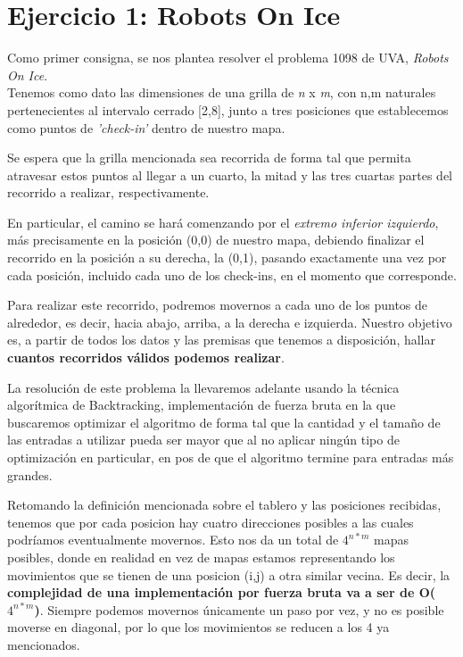 \section{Ejercicio 1: Robots On Ice}

Como primer consigna, se nos plantea resolver el problema 1098 de UVA, \textit{Robots On Ice}. \\

Tenemos como dato las dimensiones de una grilla de \textit{n} x \textit{m}, con n,m naturales pertenecientes al intervalo cerrado [2,8], junto a tres posiciones que establecemos como puntos de \textit{'check-in'} dentro de nuestro mapa. 

Se espera que la grilla mencionada sea recorrida de forma tal que permita atravesar estos puntos al llegar a un cuarto, la mitad y las tres cuartas partes del recorrido a realizar, respectivamente. 

En particular, el camino se hará comenzando por el \textit{extremo inferior izquierdo}, más precisamente en la posición (0,0) de nuestro mapa, debiendo finalizar el recorrido en la posición a su derecha, la (0,1), pasando exactamente una vez por cada posición, incluido cada uno de los check-ins, en el momento que corresponde. 

Para realizar este recorrido, podremos movernos a cada uno de los puntos de alrededor, es decir, hacia abajo, arriba, a la derecha e izquierda.
Nuestro objetivo es, a partir de todos los datos y las premisas que tenemos a disposición, hallar \textbf{cuantos recorridos válidos podemos realizar}.  \newline

La resolución de este problema la llevaremos adelante usando la técnica algorítmica de Backtracking, implementación de fuerza bruta en la que buscaremos optimizar el algoritmo de forma tal que la cantidad y el tamaño de las entradas a utilizar pueda ser mayor que al no aplicar ningún tipo de optimización en particular, en pos de que el algoritmo termine para entradas más grandes. \newline

Retomando la definición mencionada sobre el tablero y las posiciones recibidas, tenemos que por cada posicion hay cuatro direcciones posibles a las cuales podríamos eventualmente movernos. Esto nos da un total de $4^{n*m}$ mapas posibles, donde en realidad en vez de mapas estamos representando los movimientos que se tienen de una posicion (i,j) a otra similar vecina. Es decir, la \textbf{complejidad de una implementación por fuerza bruta va a ser de O($4^{n*m}$)}. 
Siempre podemos movernos únicamente un paso por vez, y no es posible moverse en diagonal, por lo que los movimientos se reducen a los 4 ya mencionados. \newline

